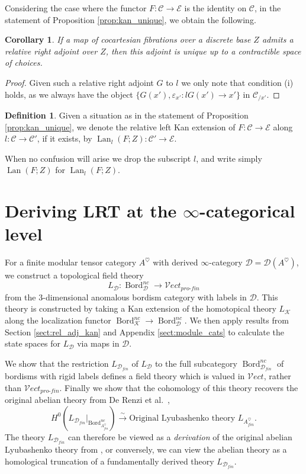 \documentclass[reqno]{amsart}
\newtheorem{corollary}[lemma]{Corollary}
\theoremstyle{definition}
\newtheorem{definition}[lemma]{Definition}
\newcommand{\msc}[1]{\mathscr{#1}}
\newcommand{\opn}[1]{\operatorname{#1}}
\newcommand{\Vect}{\msc{V}\!ect}
\newcommand{\pf}{pro\text{-}fin}
\DeclareMathOperator{\Bord}{Bord}
\renewcommand{\1}{\mathbf{1}}
\begin{document}
Considering the case where the functor $F:\msc{C}\to \msc{E}$ is the identity on $\msc{C}$, in the statement of Proposition \ref{prop:kan_unique}, we obtain the following.

\begin{corollary}\label{cor:unique_kan_ra}
If a map of cocartesian fibrations over a discrete base $Z$ admits a relative right adjoint over $Z$, then this adjoint is unique up to a contractible space of choices.
\end{corollary}

\begin{proof}
Given such a relative right adjoint $G$ to $l$ we only note that condition (i) holds, as we always have the object $\{G(x'),\varepsilon_{x'}:lG(x')\to x'\}$ in $\msc{C}_{/x'}$.
\end{proof}

\begin{definition}
Given a situation as in the statement of Proposition \ref{prop:kan_unique}, we denote the relative left Kan extension of $F:\msc{C}\to \msc{E}$ along $l:\msc{C}\to \msc{C}'$, if it exists, by $\opn{Lan}_l(F;Z):\msc{C}'\to \msc{E}$.
\end{definition}

When no confusion will arise we drop the subscript $l$, and write simply $\opn{Lan}(F;Z)$ for $\opn{Lan}_l(F;Z)$.

\section{Deriving LRT at the $\infty$-categorical level}
\label{sect:derived_lrt}

For a finite modular tensor category $A^{\heartsuit}$ with derived $\infty$-category $\msc{D}=\msc{D}(A^{\heartsuit})$, we construct a topological field theory
\[
L_{\msc{D}}:\Bord^{nc}_{\msc{D}}\to \Vect_{\pf}
\]
from the $3$-dimensional anomalous bordism category with labels in $\msc{D}$. This theory is constructed by taking a Kan extension of the homotopical theory $L_{\msc{K}}$ along the localization functor $\Bord^{nc}_{\msc{K}}\to \Bord^{nc}_{\msc{D}}$. We then apply results from Section \ref{sect:rel_adj_kan} and Appendix \ref{sect:module_cats} to calculate the state spaces for $L_{\msc{D}}$ via maps in $\msc{D}$.
\par

We show that the restriction $L_{\msc{D}_{fin}}$ of $L_{\msc{D}}$ to the full subcategory $\Bord^{nc}_{\msc{D}_{fin}}$ of bordisms with rigid labels defines a field theory which is valued in $\Vect$, rather than $\Vect_{\pf}$. Finally we show that the cohomology of this theory recovers the original abelian theory from De Renzi et al.\ \cite{derenzietal23},
\[
H^0(L_{\msc{D}_{fin}}|_{\Bord^{nc}_{A^{\heartsuit}_{fin}}})\overset{\sim}\to \text{Original Lyubashenko theory }L_{A^{\heartsuit}_{fin}}.
\]
The theory $L_{\msc{D}_{fin}}$ can therefore be viewed as a \emph{derivation} of the original abelian Lyubashenko theory from \cite{derenzietal23}, or conversely, we can view the abelian theory as a homological truncation of a fundamentally derived theory $L_{\msc{D}_{fin}}$.
\end{document}
